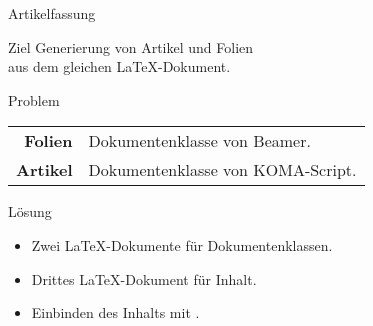 \begin{Frame}[fragile]{Artikelfassung}
  \begin{Block}{Ziel}
    Generierung von Artikel und Folien\\
    aus dem gleichen \LaTeX-Dokument.
  \end{Block}

  \xxx
  \pause

  \begin{Block}{Problem}
    \begin{tabular}{r@{ }l}
      \textbf{Folien} & Dokumentenklasse von Beamer.\\
      \textbf{Artikel} & Dokumentenklasse von KOMA-Script.
    \end{tabular}
  \end{Block}

  \xxx
  \pause

  \begin{Block}{Lösung}
    \begin{itemize}
      \item Zwei \LaTeX-Dokumente für Dokumentenklassen.
      \item Drittes \LaTeX-Dokument für Inhalt.
      \item Einbinden des Inhalts mit \lstinline--.
    \end{itemize}
  \end{Block}
\end{Frame}

